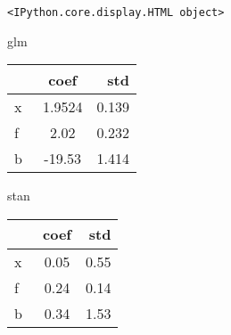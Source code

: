 \documentclass[11pt]{article}
\begin{document}
    
    \begin{verbatim}
<IPython.core.display.HTML object>
    \end{verbatim}

    
    glm

\begin{longtable}[]{@{}lcr@{}}
\toprule
　 & coef & std\tabularnewline
\midrule
\endhead
x & 1.9524 & 0.139\tabularnewline
f & 2.02 & 0.232\tabularnewline
b & -19.53 & 1.414\tabularnewline
\bottomrule
\end{longtable}

    stan

\begin{longtable}[]{@{}lcr@{}}
\toprule
　 & coef & std\tabularnewline
\midrule
\endhead
x & 0.05 & 0.55\tabularnewline
f & 0.24 & 0.14\tabularnewline
b & 0.34 & 1.53\tabularnewline
\bottomrule
\end{longtable}


    
    
    
    
\end{document}

